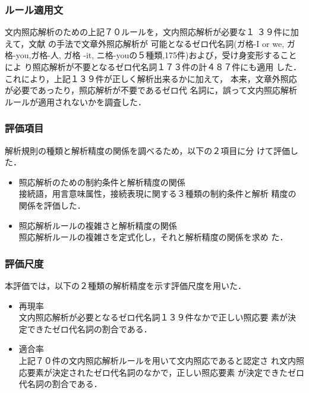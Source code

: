 \subsubsection{ルール適用文}

文内照応解析のための上記７０ルールを，文内照応解析が必要な１
３９件に加えて，文献
\cite{NakaiwaShiraiIkehara1994,NakaiwaShiraiIkeharaKawaoka1995}
の手法で文章外照応解析が
可能となるゼロ代名詞(ガ格-I or we, ガ格-you,ガ格-人, ガ格
-it, ニ格-youの５種類,175件)および，受け身変形することによ
り照応解析が不要となるゼロ代名詞１７３件の計４８７件にも適用
した．これにより，上記１３９件が正しく解析出来るかに加えて，
本来，文章外照応が必要であったり，照応解析が不要であるゼロ代
名詞に，誤って文内照応解析ルールが適用されないかを調査した．

\subsubsection{評価項目}
解析規則の種類と解析精度の関係を調べるため，以下の２項目に分
けて評価した．

\begin{itemize}
\item 照応解析のための制約条件と解析精度の関係\\ 
接続語，用言意味属性，接続表現に関する３種類の制約条件と解析
精度の関係を評価した．
\item 照応解析ルールの複雑さと解析精度の関係\\
照応解析ルールの複雑さを定式化し，それと解析精度の関係を求め
た．
\end{itemize}
\vspace*{-3mm}
\subsubsection{評価尺度}

本評価では，以下の２種類の解析精度を示す評価尺度を用いた．

\begin{itemize}
\item 再現率\\ 
文内照応解析が必要となるゼロ代名詞１３９件なかで正しい照応要
素が決定できたゼロ代名詞の割合である．
\item 適合率\\
上記７０件の文内照応解析ルールを用いて文内照応であると認定さ
れ文内照応要素が決定されたゼロ代名詞のなかで，正しい照応要素
が決定できたゼロ代名詞の割合である．
\end{itemize}

